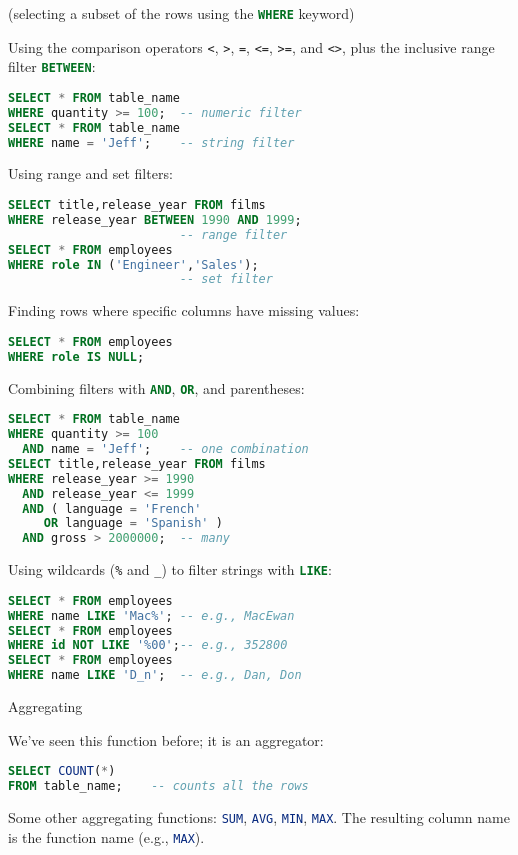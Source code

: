 \documentclass[a4paper,landscape,columns=3]{cheatsheet}
\def\sect#1{\begin{tcolorbox}[colback=blue!5!white,colframe=blue!75!black,size=title,leftrule=2mm]
    \large #1
\end{tcolorbox}}
\begin{document}
(selecting a subset of the rows using the \lstinline[language=sql]{WHERE} keyword)

Using the comparison operators \verb'<', \verb'>', \verb'=', \verb'<=', \verb'>=', and \verb'<>', plus the inclusive range filter \lstinline[language=sql]{BETWEEN}:
\begin{lstlisting}[language=sql,frame=single,rulecolor=\color{gray}]
SELECT * FROM table_name
WHERE quantity >= 100;  -- numeric filter
SELECT * FROM table_name
WHERE name = 'Jeff';    -- string filter
\end{lstlisting}

Using range and set filters:
\begin{lstlisting}[language=sql,frame=single,rulecolor=\color{gray}]
SELECT title,release_year FROM films
WHERE release_year BETWEEN 1990 AND 1999;
                        -- range filter
SELECT * FROM employees
WHERE role IN ('Engineer','Sales');
                        -- set filter
\end{lstlisting}

Finding rows where specific columns have missing values:
\begin{lstlisting}[language=sql,frame=single,rulecolor=\color{gray}]
SELECT * FROM employees
WHERE role IS NULL;
\end{lstlisting}

Combining filters with \lstinline[language=sql]{AND}, \lstinline[language=sql]{OR}, and parentheses:
\begin{lstlisting}[language=sql,frame=single,rulecolor=\color{gray}]
SELECT * FROM table_name
WHERE quantity >= 100
  AND name = 'Jeff';    -- one combination
SELECT title,release_year FROM films
WHERE release_year >= 1990
  AND release_year <= 1999
  AND ( language = 'French'
     OR language = 'Spanish' )
  AND gross > 2000000;  -- many
\end{lstlisting}

Using wildcards (\verb'%' and \verb'_') to filter strings with \lstinline[language=sql]{LIKE}:
\begin{lstlisting}[language=sql,frame=single,rulecolor=\color{gray}]
SELECT * FROM employees
WHERE name LIKE 'Mac%'; -- e.g., MacEwan
SELECT * FROM employees
WHERE id NOT LIKE '%00';-- e.g., 352800
SELECT * FROM employees
WHERE name LIKE 'D_n';  -- e.g., Dan, Don
\end{lstlisting}

\sect{Aggregating}

We've seen this function before; it is an aggregator:
\begin{lstlisting}[language=sql,frame=single,rulecolor=\color{gray}]
SELECT COUNT(*)
FROM table_name;    -- counts all the rows
\end{lstlisting}
Some other aggregating functions:
\lstinline[language=sql]{SUM},
\lstinline[language=sql]{AVG},
\lstinline[language=sql]{MIN},
\lstinline[language=sql]{MAX}.  The resulting column name is the function name (e.g., \lstinline[language=sql]{MAX}).
\end{document}
